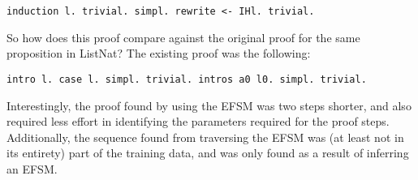 \documentclass{llncs}
\begin{document}
\vspace{2mm}
\noindent\texttt{induction l. trivial. simpl. rewrite <- IHl. trivial.} 
\vspace{2mm}

\noindent So how does this proof compare against the original proof for the same proposition in ListNat? The existing proof was the following:

\vspace{2mm}
\noindent\texttt{intro l. case l. simpl. trivial. intros a0 l0. simpl. trivial.} 
\vspace{2mm}

\noindent Interestingly, the proof found by using the EFSM was two steps shorter, and also required less effort in identifying the parameters required for the proof steps. Additionally, the sequence found from traversing the EFSM was (at least not in its entirety) part of the training data, and was only found as a result of inferring an EFSM.
\end{document}
